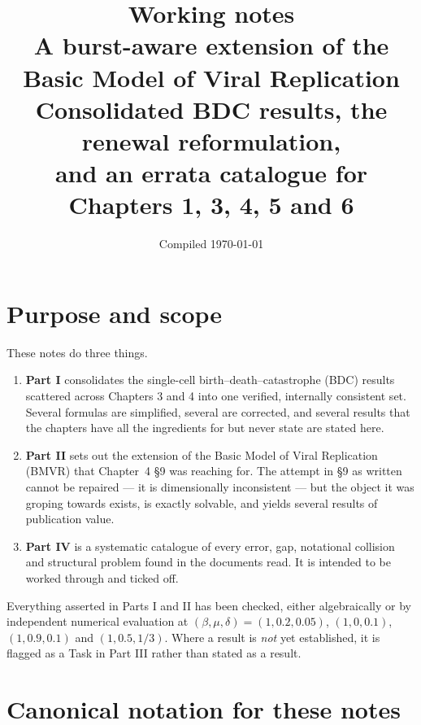 \documentclass[11pt]{article}
\title{\textbf{Working notes}\\[0.4em]
A burst-aware extension of the Basic Model of Viral Replication\\[0.3em]
\large Consolidated BDC results, the renewal reformulation,\\
and an errata catalogue for Chapters 1, 3, 4, 5 and 6}
\author{}
\date{Compiled \today}
\theoremstyle{plain}
\theoremstyle{definition}
\theoremstyle{remark}
\begin{document}
\maketitle
\vspace{-3em}

\tableofcontents
\clearpage

\section{Purpose and scope}

These notes do three things.

\begin{enumerate}[leftmargin=1.6em]
\item \textbf{Part I} consolidates the single-cell birth--death--catastrophe (BDC) results
scattered across Chapters 3 and 4 into one verified, internally consistent set. Several
formulas are simplified, several are corrected, and several results that the chapters
have all the ingredients for but never state are stated here.

\item \textbf{Part II} sets out the extension of the Basic Model of Viral Replication (BMVR)
that Chapter~4 \S9 was reaching for. The attempt in \S9 as written cannot be repaired ---
it is dimensionally inconsistent --- but the object it was groping towards exists,
is exactly solvable, and yields several results of publication value.

\item \textbf{Part IV} is a systematic catalogue of every error, gap, notational collision
and structural problem found in the documents read. It is intended to be worked through
and ticked off.
\end{enumerate}

Everything asserted in Parts I and II has been checked, either algebraically or by
independent numerical evaluation at $(\beta,\mu,\delta)=(1,0.2,0.05)$, $(1,0,0.1)$,
$(1,0.9,0.1)$ and $(1,0.5,1/3)$. Where a result is \emph{not} yet established, it is
flagged as a Task in Part III rather than stated as a result.

\section{Canonical notation for these notes}
\end{document}

